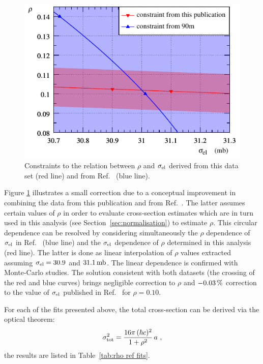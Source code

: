 \begin{figure}
\begin{center}
\includegraphics{fig/si_el_rho_solution.pdf}
\caption{%
Constraints to the relation between $\rho$ and $\sigma_{\rm el}$ derived from this data set (red line) and from Ref.~\cite{totem-13tev-90m} (blue line).
}
\label{fig:si_el rho sol}
\end{center}
\end{figure}

Figure \ref{fig:si_el rho sol} illustrates a small correction due to a conceptual improvement in combining the data from this publication and from Ref.~\cite{totem-13tev-90m}. The latter assumes certain values of $\rho$ in order to evaluate cross-section estimates which are in turn used in this analysis (see Section~\ref{sec:normalisation}) to estimate $\rho$. This circular dependence can be resolved by considering simultaneously the $\rho$ dependence of $\sigma_{\rm el}$ in Ref.~\cite{totem-13tev-90m} (blue line) and the $\sigma_{\rm el}$ dependence of $\rho$ determined in this analysis (red line). The latter is done as linear interpolation of $\rho$ values extracted assuming $\sigma_{\rm el} = 30.9$ and $31.1\,{\rm mb}$. The linear dependence is confirmed with Monte-Carlo studies. The solution consistent with both datasets (the crossing of the red and blue curves) brings negligible correction to $\rho$ and $-0.03\,{\rm \%}$ correction to the value of $\sigma_{\rm el}$ published in Ref.~\cite{totem-13tev-90m} for $\rho=0.10$.


For each of the fits presented above, the total cross-section can be derived via the optical theorem:
\begin{equation}
\label{eq:si tot}
\sigma_{\rm tot}^2 = {16\pi\, (\hbar c)^2\over 1 + \rho^2}\, a\ ,
\end{equation}
the results are listed in Table~\ref{tab:rho ref fits}.



